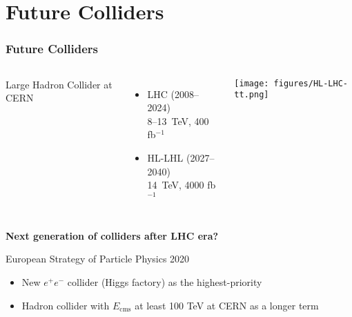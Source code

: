 \documentclass[aspectratio=169]{beamer}
\newcommand{\bluetext}[1]{%
  \textcolor{myBlue}{#1}
}
\begin{document}
\section{Future Colliders}

\begin{frame}
  \frametitle{Future Colliders}

  \begin{columns}[c]

    \bluetext{Large Hadron Collider at CERN}
    \begin{itemize}
    \item LHC (2008--2024)\\
     8--13~TeV, 400 fb$^{-1}$
    \item HL-LHL (2027--2040)\\
     14~TeV, 4000 fb$^{-1}$
    \end{itemize}


    \begin{center}
      \texttt{[image: figures/HL-LHC-tt.png]} \\
    \end{center}
  \end{columns}
  \pause%

  \vspace{2ex}
  \bluetext{{\bf Next generation of colliders after LHC era?}} \\
  \vspace{2ex}

  \bluetext{European Strategy of Particle Physics 2020} \\
  \begin{itemize}
    \item New $e^+e^-$ collider (Higgs factory) as the highest-priority
    \item Hadron collider with $E_{\mathrm{cms}}$ at least 100 TeV at CERN as
          a longer term
  \end{itemize}
\end{frame}
\end{document}
